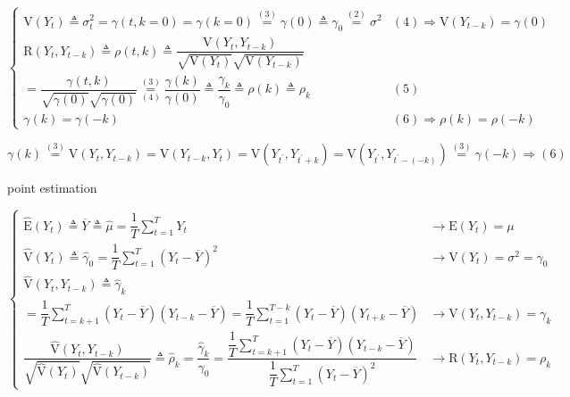 \documentclass[
]{book}
\theoremstyle{definition}
\theoremstyle{definition}
\theoremstyle{definition}
\theoremstyle{definition}
\theoremstyle{remark}
\begin{document}
\[
\begin{cases}
\mathrm{V}\left(Y_{t}\right)\triangleq\sigma_{t}^{2}=\gamma\left(t,k=0\right)=\gamma\left(k=0\right)\overset{\left(3\right)}{=}\gamma\left(0\right)\triangleq\gamma_{0}\overset{\left(2\right)}{=}\sigma^{2} & \left(4\right)\Rightarrow\mathrm{V}\left(Y_{t-k}\right)=\gamma\left(0\right)\\
\mathrm{R}\left(Y_{t},Y_{t-k}\right)\triangleq\rho\left(t,k\right)\triangleq\dfrac{\mathrm{V}\left(Y_{t},Y_{t-k}\right)}{\sqrt{\mathrm{V}\left(Y_{t}\right)}\sqrt{\mathrm{V}\left(Y_{t-k}\right)}}\\
=\dfrac{\gamma\left(t,k\right)}{\sqrt{\gamma\left(0\right)}\sqrt{\gamma\left(0\right)}}\overset{\left(3\right)}{\underset{\left(4\right)}{=}}\dfrac{\gamma\left(k\right)}{\gamma\left(0\right)}\triangleq\dfrac{\gamma_{k}}{\gamma_{0}}\triangleq\rho\left(k\right)\triangleq\rho_{k} & \left(5\right)\\
\gamma\left(k\right)=\gamma\left(-k\right) & \left(6\right)\Rightarrow\rho\left(k\right)=\rho\left(-k\right)
\end{cases}
\]

\[
\gamma\left(k\right)\overset{\left(3\right)}{=}\mathrm{V}\left(Y_{t},Y_{t-k}\right)=\mathrm{V}\left(Y_{t-k},Y_{t}\right)=\mathrm{V}\left(Y_{t^{\prime}},Y_{t^{\prime}+k}\right)=\mathrm{V}\left(Y_{t^{\prime}},Y_{t^{\prime}-\left(-k\right)}\right)\overset{\left(3\right)}{=}\gamma\left(-k\right)\Rightarrow\left(6\right)
\]

point estimation

\[
\begin{cases}
\widehat{\mathrm{E}}\left(Y_{t}\right)\triangleq\overline{Y}\triangleq\widehat{\mu}=\dfrac{1}{T}\sum\limits _{t=1}^{T}Y_{t} & \rightarrow\mathrm{E}\left(Y_{t}\right)=\mu\\
\widehat{\mathrm{V}}\left(Y_{t}\right)\triangleq\widehat{\gamma}_{0}=\dfrac{1}{T}\sum\limits _{t=1}^{T}\left(Y_{t}-\overline{Y}\right)^{2} & \rightarrow\mathrm{V}\left(Y_{t}\right)=\sigma^{2}=\gamma_{0}\\
\widehat{\mathrm{V}}\left(Y_{t},Y_{t-k}\right)\triangleq\widehat{\gamma}_{k}\\
=\dfrac{1}{T}\sum\limits _{t=k+1}^{T}\left(Y_{t}-\overline{Y}\right)\left(Y_{t-k}-\overline{Y}\right)=\dfrac{1}{T}\sum\limits _{t=1}^{T-k}\left(Y_{t}-\overline{Y}\right)\left(Y_{t+k}-\overline{Y}\right) & \rightarrow\mathrm{V}\left(Y_{t},Y_{t-k}\right)=\gamma_{k}\\
\dfrac{\widehat{\mathrm{V}}\left(Y_{t},Y_{t-k}\right)}{\sqrt{\mathrm{\widehat{\mathrm{V}}}\left(Y_{t}\right)}\sqrt{\mathrm{\widehat{\mathrm{V}}}\left(Y_{t-k}\right)}}\triangleq\widehat{\rho}_{k}=\dfrac{\widehat{\gamma}_{k}}{\widehat{\gamma}_{0}}=\dfrac{\dfrac{1}{T}\sum\limits _{t=k+1}^{T}\left(Y_{t}-\overline{Y}\right)\left(Y_{t-k}-\overline{Y}\right)}{\dfrac{1}{T}\sum\limits _{t=1}^{T}\left(Y_{t}-\overline{Y}\right)^{2}} & \rightarrow\mathrm{R}\left(Y_{t},Y_{t-k}\right)=\rho_{k}
\end{cases}
\]
\end{document}

